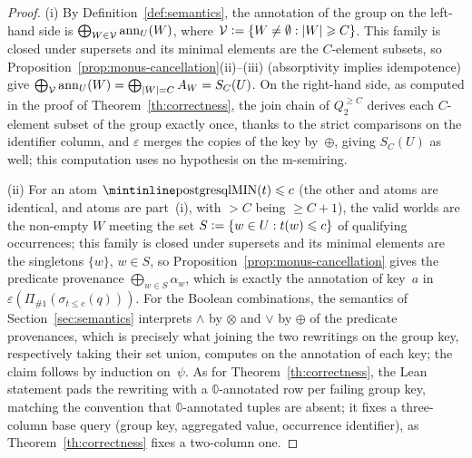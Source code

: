 \begin{toappendix}
\begin{proof}
  (i) By Definition~\ref{def:semantics}, the annotation of the group
  on the left-hand side is $\bigoplus_{W\in\mathcal V}\mathrm{ann}_U(W)$,
  where $\mathcal V\mathrel{\mathop:}=\{W\neq\emptyset:|W|\geqslant C\}$. This family
  is closed under supersets
  and its minimal elements are the $C$-element subsets, so
  Proposition~\ref{prop:monus-cancellation}(ii)--(iii) (absorptivity
  implies idempotence) give
  $\bigoplus_{\mathcal V}\mathrm{ann}_U(W)=\bigoplus_{|W|=C}A_W=S_C(U)$. On
  the right-hand side, as computed in the proof of
  Theorem~\ref{th:correctness}, the join chain of $Q^{\geq C}_2$
  derives each $C$-element subset of the group exactly once, thanks to
  the strict comparisons on the identifier column, and $\varepsilon$
  merges the copies of the key by~$\oplus$, giving $S_C(U)$ as well;
  this computation uses no hypothesis on the m-semiring.

  (ii)
  For an atom $\text{\sql{MIN}}(t)\leq c$ (the other 
  and  atoms are identical, and  atoms are
  part~(i), with $>C$ being $\geq C+1$), the valid worlds are the
  non-empty $W$ meeting the set
  $S\mathrel{\mathop:}=\{w\in U: t(w)\leqslant c\}$ of qualifying occurrences; this
  family is closed under supersets and its minimal elements are the
  singletons $\{w\}$, $w\in S$, so
  Proposition~\ref{prop:monus-cancellation} gives the predicate
  provenance $\bigoplus_{w\in S}\alpha_w$, which is exactly the
  annotation of key~$a$ in
  $\varepsilon(\Pi_{\#1}(\sigma_{t\leq c}(q)))$. For the Boolean
  combinations, the semantics of Section~\ref{sec:semantics}
  interprets $\land$ by $\otimes$ and $\lor$ by $\oplus$ of the
  predicate provenances, which is precisely what joining the two
  rewritings on the group key, respectively taking their set union,
  computes on the annotation of each key; the claim follows by
  induction on~$\psi$. As for Theorem~\ref{th:correctness}, the Lean
  statement pads the rewriting with a $\mathbb 0$-annotated row per
  failing group key, matching the convention that
  $\mathbb 0$-annotated tuples are absent; it fixes a three-column
  base query (group key, aggregated value, occurrence identifier), as
  Theorem~\ref{th:correctness} fixes a two-column one.
\end{proof}


\end{toappendix}
